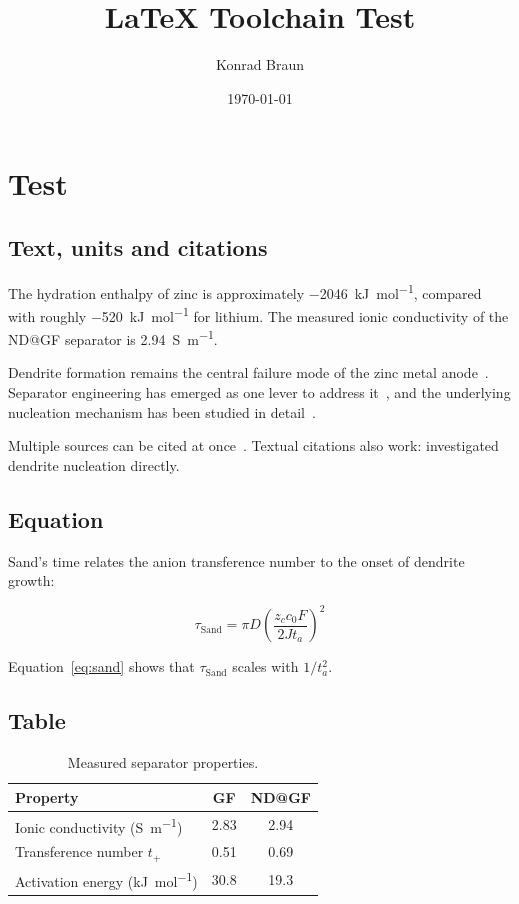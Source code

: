 \documentclass[11pt,a4paper]{report}
\title{LaTeX Toolchain Test}
\author{Konrad Braun}
\date{\today}
\begin{document}
\maketitle

\chapter{Test}

\section{Text, units and citations}

The hydration enthalpy of zinc is approximately
\SI{-2046}{\kilo\joule\per\mole}, compared with roughly
\SI{-520}{\kilo\joule\per\mole} for lithium. The measured ionic
conductivity of the ND@GF separator is \SI{2.94}{\siemens\per\metre}.

Dendrite formation remains the central failure mode of the zinc metal
anode~\cite{yu_ten_2023}. Separator engineering has emerged as one
lever to address it~\cite{gu_role_2025}, and the underlying
nucleation mechanism has been studied in
detail~\cite{zhang_unveiling_2024}.

Multiple sources can be cited at once~\cite{yu_ten_2023,gu_role_2025}.
Textual citations also work: \textcite{zhang_unveiling_2024} investigated
dendrite nucleation directly.

\section{Equation}

Sand's time relates the anion transference number to the onset of
dendrite growth:

\begin{equation}
    \tau_\text{Sand} = \pi D \left( \frac{z_c c_0 F}{2 J t_a} \right)^{2}
    \label{eq:sand}
\end{equation}

Equation~\eqref{eq:sand} shows that $\tau_\text{Sand}$ scales with
$1/t_a^{2}$.

\section{Table}

\begin{table}[h]
    \centering
    \caption{Measured separator properties.}
    \label{tab:properties}
    \begin{tabular}{lcc}
        \toprule
        Property & GF & ND@GF \\
        \midrule
        Ionic conductivity (\si{\siemens\per\metre}) & 2.83 & 2.94 \\
        Transference number $t_+$ & 0.51 & 0.69 \\
        Activation energy (\si{\kilo\joule\per\mole}) & 30.8 & 19.3 \\
        \bottomrule
    \end{tabular}
\end{table}

\printbibliography
\end{document}
